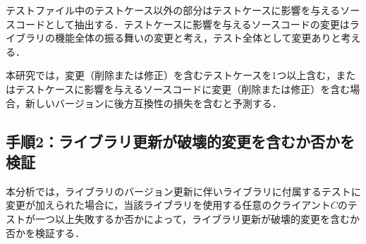 \documentclass[submit]{ipsj}
\begin{document}

テストファイル中のテストケース以外の部分はテストケースに影響を与えるソースコードとして抽出する．テストケースに影響を与えるソースコードの変更はライブラリの機能全体の振る舞いの変更と考え，テスト全体として変更ありと考える．

本研究では，変更（削除または修正）を含むテストケースを1つ以上含む，またはテストケースに影響を与えるソースコードに変更（削除または修正）を含む場合，新しいバージョンに後方互換性の損失を含むと予測する．

\subsection{手順2：ライブラリ更新が破壊的変更を含むか否かを検証}
\label{sec:step2}

本分析では，ライブラリのバージョン更新に伴いライブラリに付属するテストに変更が加えられた場合に，当該ライブラリを使用する任意のクライアント$C$のテストが一つ以上失敗するか否かによって，ライブラリ更新が破壊的変更を含むか否かを検証する．


\end{document}
